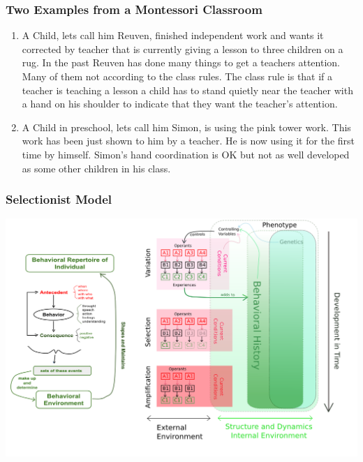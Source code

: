\documentclass[12pt, handout, notes=show]{beamer}
\begin{document}
\begin{frame}
  \frametitle{Two Examples from a Montessori Classroom}
  \begin{enumerate}
  \item A Child, lets call him Reuven, finished independent work and
    wants it corrected by teacher that is currently giving a lesson to
    three children on a rug. In the past Reuven has done many things
    to get a teachers attention. Many of them not according to the
    class rules. The class rule is that if a teacher is teaching a
    lesson a child has to stand quietly near the teacher with a hand
    on his shoulder to indicate that they want the teacher's
    attention.
  \item A Child in preschool, lets call him Simon, is using the pink
    tower work. This work has been just shown to him by a teacher. He
    is now using it for the first time by himself. Simon's hand
    coordination is OK but not as well developed as some other
    children in his class.

  \end{enumerate}

\end{frame}



\begin{frame}
  \frametitle{Selectionist Model}
  \begin{center}
    \includegraphics[scale=0.37]{graphics/Selectionist-Model.png}
  \end{center}
\end{frame}
\end{document}
